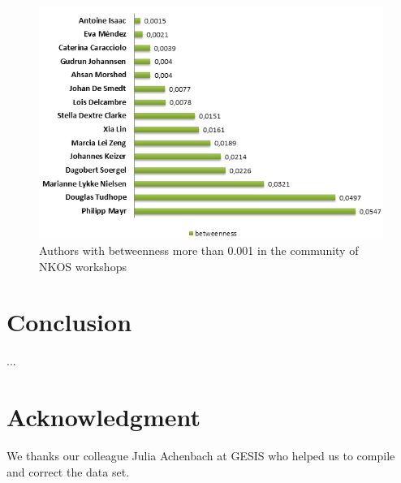 \documentclass[runningheads,a4paper]{llncs}
\begin{document}
\begin{figure}
\centering
\includegraphics[width=0.7\linewidth]{betweenness}
\caption{Authors with betweenness more than 0.001 in the community of NKOS workshops}
\label{fig:betweenness}
\end{figure}






\section{Conclusion}\label{concl}
...%

\section{Acknowledgment}\label{sec:ACKNOWLEDGMENTS}
We thanks our colleague Julia Achenbach at GESIS who helped us to compile and correct the data set.

\newpage

 
\end{document}
